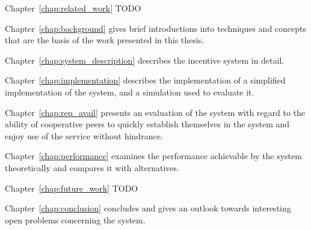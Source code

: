 Chapter~\ref{chap:related_work} TODO

Chapter~\ref{chap:background} gives brief introductions into techniques and
concepts that are the basis of the work presented in this thesis.

Chapter~\ref{chap:system_description} describes the incentive system in detail.

Chapter~\ref{chap:implementation} describes the implementation of a simplified
implementation of the system, and a simulation used to evaluate it.

Chapter~\ref{chap:rep_avail} presents an evaluation of the system with regard to
the ability of cooperative peers to quickly establish themselves in the system
and enjoy use of the service without hindrance.

Chapter~\ref{chap:performance} examines the performance achievable by the system
theoretically and compares it with alternatives.

Chapter~\ref{chap:future_work} TODO

Chapter~\ref{chap:conclusion} concludes and gives an outlook towards interesting
open problems concerning the system.
